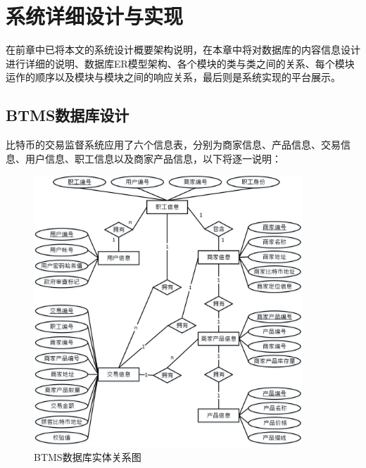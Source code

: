 \chapter{系统详细设计与实现}
在前章中已将本文的系统设计概要架构说明，在本章中将对数据库的内容信息设计进行详细的说明、数据库ER模型架构、各个模块的类与类之间的关系、每个模块运作的顺序以及模块与模块之间的响应关系，最后则是系统实现的平台展示。

	\section{BTMS数据库设计}

	比特币的交易监督系统应用了六个信息表，分别为商家信息、产品信息、交易信息、用户信息、职工信息以及商家产品信息，以下将逐一说明：

		\begin{figure}[!htbp]
			\centering
			\includegraphics[width = 0.9\textwidth]{er.jpg}
			\caption{BTMS数据库实体关系图}\label{db}
		\end{figure}

